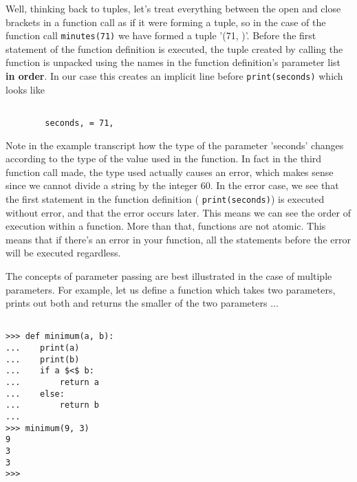 Well, thinking back to tuples, let's treat everything between the   open and close brackets in a function call as if it were forming a   tuple, so in the case of the function call 
\texttt{minutes(71)} we   have formed a tuple '(71, )'. Before the first statement of the   function definition is executed, the tuple created by calling the   function is unpacked using the names in the function definition's   parameter list \textbf{in order}. In our case this creates an   implicit line before 
\texttt{print(seconds)} which looks like
\begin{lstlisting}

		seconds, = 71,
\end{lstlisting}

Note in the example transcript how the type of the parameter   'seconds' changes according to the type of the value used in the   function. In fact in the third function call made, the type used   actually causes an error, which makes sense since we cannot divide a   string by the integer 60. In the error case, we see that the first   statement in the function definition (
\texttt{print(seconds)}) is   executed without error, and that the error occurs later. This means we can see the order of execution within a function.     More than that, functions are not atomic. This means that if there's an error in your function, all the      statements before the error will be executed regardless.

The concepts of parameter passing are best illustrated in the case   of multiple parameters. For example, let us define a function which   takes two parameters, prints out both and returns the smaller of the two parameters ...
\begin{lstlisting}

>>> def minimum(a, b):
...    print(a)
...    print(b)
...    if a $<$ b:
...        return a
...    else:
...        return b
...
>>> minimum(9, 3)
9
3
3
>>>
\end{lstlisting}

